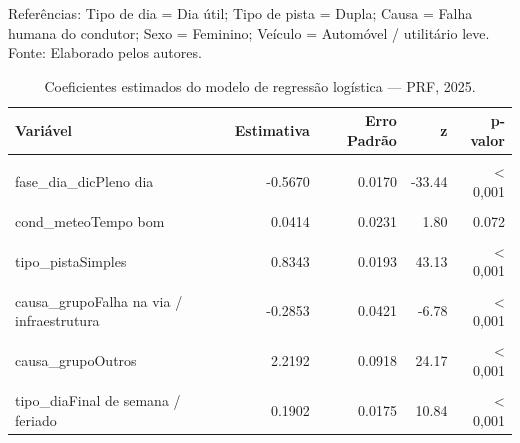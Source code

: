 \documentclass[
  brazilian,
  12pt,
]{article}
\begin{document}
\begin{ThreePartTable}
\begin{TableNotes}
\item Referências: Tipo de dia = Dia útil; Tipo de pista = Dupla; Causa = Falha humana do condutor; Sexo = Feminino; Veículo = Automóvel / utilitário leve. Fonte: Elaborado pelos autores.
\end{TableNotes}
\begin{longtable}[t]{>{\raggedright\arraybackslash}p{5cm}rrrr}
\caption{\label{tab:tab-reg}Coeficientes estimados do modelo de regressão logística — PRF, 2025.}\\
\toprule
Variável & Estimativa & Erro Padrão & z & p-valor\\
\midrule
\cellcolor{gray!10}{(Intercept)} & \cellcolor{gray!10}{-2.8479} & \cellcolor{gray!10}{0.0291} & \cellcolor{gray!10}{-97.92} & \cellcolor{gray!10}{< 0,001}\\
fase\_dia\_dicPleno dia & -0.5670 & 0.0170 & -33.44 & < 0,001\\
\cellcolor{gray!10}{cond\_meteoTempo adverso} & \cellcolor{gray!10}{-0.0424} & \cellcolor{gray!10}{0.0322} & \cellcolor{gray!10}{-1.31} & \cellcolor{gray!10}{0.189}\\
cond\_meteoTempo bom & 0.0414 & 0.0231 & 1.80 & 0.072\\
\cellcolor{gray!10}{tipo\_pistaMúltipla} & \cellcolor{gray!10}{-0.2345} & \cellcolor{gray!10}{0.0433} & \cellcolor{gray!10}{-5.42} & \cellcolor{gray!10}{< 0,001}\\
\addlinespace
tipo\_pistaSimples & 0.8343 & 0.0193 & 43.13 & < 0,001\\
\cellcolor{gray!10}{causa\_grupoFalha mecânica do veículo} & \cellcolor{gray!10}{-1.1477} & \cellcolor{gray!10}{0.0525} & \cellcolor{gray!10}{-21.86} & \cellcolor{gray!10}{< 0,001}\\
causa\_grupoFalha na via / infraestrutura & -0.2853 & 0.0421 & -6.78 & < 0,001\\
\cellcolor{gray!10}{causa\_grupoFatores ambientais} & \cellcolor{gray!10}{-0.2692} & \cellcolor{gray!10}{0.0710} & \cellcolor{gray!10}{-3.79} & \cellcolor{gray!10}{< 0,001}\\
causa\_grupoOutros & 2.2192 & 0.0918 & 24.17 & < 0,001\\
\addlinespace
\cellcolor{gray!10}{causa\_grupoPedestre / terceiros} & \cellcolor{gray!10}{0.3165} & \cellcolor{gray!10}{0.0324} & \cellcolor{gray!10}{9.78} & \cellcolor{gray!10}{< 0,001}\\
tipo\_diaFinal de semana / feriado & 0.1902 & 0.0175 & 10.84 & < 0,001\\

\end{longtable}
\end{ThreePartTable}
\end{document}
